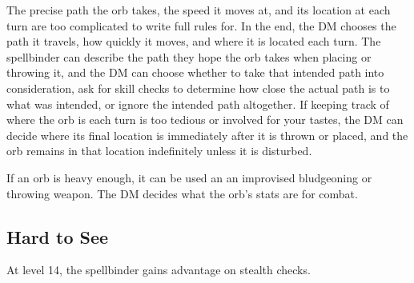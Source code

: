 The precise path the orb takes, the speed it moves at, and its location at each turn are too complicated to write full rules for. In the end, the DM chooses the path it travels, how quickly it moves, and where it is located each turn. The spellbinder can describe the path they hope the orb takes when placing or throwing it, and the DM can choose whether to take that intended path into consideration, ask for skill checks to determine how close the actual path is to what was intended, or ignore the intended path altogether. If keeping track of where the orb is each turn is too tedious or involved for your tastes, the DM can decide where its final location is immediately after it is thrown or placed, and the orb remains in that location indefinitely unless it is disturbed.

If an orb is heavy enough, it can be used an an improvised bludgeoning or throwing weapon. The DM decides what the orb's stats are for combat.

\subsection{Hard to See}
At level 14, the spellbinder gains advantage on stealth checks.